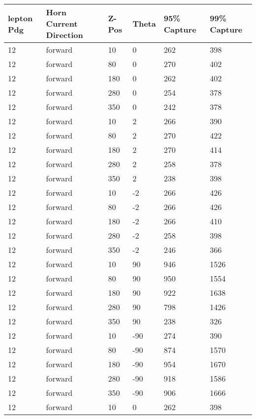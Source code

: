 \begin{longtable}{|l|l|l|l|l|l|}
			\hline
			lepton Pdg & Horn Current Direction & Z-Pos & Theta & 95\% Capture & 99\% Capture \\
			\hline
			12 & forward & 10 & 0 & 262 & 398 \\
			\hline
			12 & forward & 80 & 0 & 270 & 402 \\
			\hline
			12 & forward & 180 & 0 & 262 & 402 \\
			\hline
			12 & forward & 280 & 0 & 254 & 378 \\
			\hline
			12 & forward & 350 & 0 & 242 & 378 \\
			\hline
			12 & forward & 10 & 2 & 266 & 390 \\
			\hline
			12 & forward & 80 & 2 & 270 & 422 \\
			\hline
			12 & forward & 180 & 2 & 270 & 414 \\
			\hline
			12 & forward & 280 & 2 & 258 & 378 \\
			\hline
			12 & forward & 350 & 2 & 238 & 398 \\
			\hline
			12 & forward & 10 & -2 & 266 & 426 \\
			\hline
			12 & forward & 80 & -2 & 266 & 426 \\
			\hline
			12 & forward & 180 & -2 & 266 & 410 \\
			\hline
			12 & forward & 280 & -2 & 258 & 398 \\
			\hline
			12 & forward & 350 & -2 & 246 & 366 \\
			\hline
			12 & forward & 10 & 90 & 946 & 1526 \\
			\hline
			12 & forward & 80 & 90 & 950 & 1554 \\
			\hline
			12 & forward & 180 & 90 & 922 & 1638 \\
			\hline
			12 & forward & 280 & 90 & 798 & 1426 \\
			\hline
			12 & forward & 350 & 90 & 238 & 326 \\
			\hline
			12 & forward & 10 & -90 & 274 & 390 \\
			\hline
			12 & forward & 80 & -90 & 874 & 1570 \\
			\hline
			12 & forward & 180 & -90 & 954 & 1670 \\
			\hline
			12 & forward & 280 & -90 & 918 & 1586 \\
			\hline
			12 & forward & 350 & -90 & 906 & 1666 \\
			\hline
			12 & forward & 10 & 0 & 262 & 398 \\
			\hline

\end{longtable}
